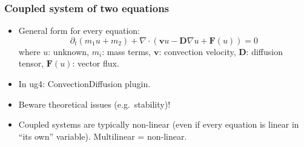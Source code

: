 \begin {frame} [t]
\frametitle {Coupled system of two equations}
\begin {itemize}
 \item General form for every equation:
  $$
   \partial_t (m_1 u + m_2) + \nabla \cdot \left ( \mathbf{v} u - \mathbf{D} \nabla u + \mathbf{F} (u) \right ) = 0
  $$
  where $u$: unknown, $m_i$: mass terms, $\mathbf{v}$: convection velocity,
  $\mathbf{D}$: diffusion tensor, $\mathbf{F} (u)$: vector flux.
 \pause
 \item In ug4: ConvectionDiffusion plugin.
 \pause
 \item Beware theoretical issues (e.g.\ stability)!
 \pause
 \item Coupled systems are typically non-linear (even if every equation is linear in
  ``its own'' variable). Multilinear = non-linear.
\end {itemize}
\end {frame}

